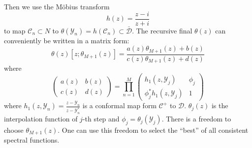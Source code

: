 \documentclass[
	preprint,%
	aps,
	prb,
	showpacs,	
	amsmath, amssymb]{revtex4-2}
\DeclareRobustCommand{\+}{\hstretch{1.25} {\boldsymbol {\mathrel{+}}}}
\begin{document}
Then we use the Möbius transform
\begin{equation}\label{eq:Mobius-transform}
	h(z) = \frac{z - i}{z + i}
\end{equation}
to map $\mathcal{C}_n \subset N$ to 
$\theta(\mathcal{Y}_n) = h(\mathcal{C}_n) \subset \bar{\mathcal{D}}$. 
The recursive final $\theta(z)$ can conveniently be written in a
matrix form:
\begin{equation}\label{eq:recursive-theta}
	\theta(z)[z;\theta_{M+1}(z)] 
		= \frac{a(z)\theta_{M+1}(z) + b(z)}{c(z)\theta_{M+1}(z) + d(z)}
\end{equation}
where
\begin{equation}\label{eq:factor-matrix}
	\left(
		\begin{matrix}
			a(z) & b(z) \\
			c(z) & d(z)
		\end{matrix}
	\right) = \prod_{n=1}^M
	\left(
		\begin{matrix}
			h_1(z, \mathcal{Y}_j) & \phi_j \\
			\phi_j^* h_1(z, \mathcal{Y}_j) & 1
		\end{matrix}
	\right)
\end{equation}
where $h_1(z, \mathcal{Y}_n) = \frac{z - \mathcal{Y}_n}{z -\mathcal{Y}_n^*}$ 
is a conformal map form $\mathcal{C}^+$ to $\mathcal{D}$. $\theta_j(z)$ is 
the interpolation function of $j$-th step and
$\phi_j = \theta_j(\mathcal{Y}_j)$. There is a freedom to choose $\theta_{M+1}(z)$.
One can use this freedom to select the “best” of all consistent spectral functions.







\end{document}
